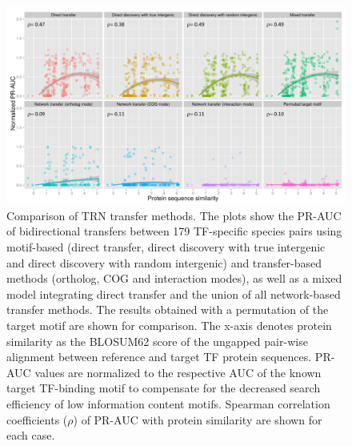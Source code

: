 \begin{figure}
  \centering
  \includegraphics[width=\textwidth]{figures/chapter3/comparison-transfer-methods}
  \caption{Comparison of TRN transfer methods. The plots show the PR-AUC of
    bidirectional transfers between 179 TF-specific species pairs using
    motif-based (direct transfer, direct discovery with true intergenic and
    direct discovery with random intergenic) and transfer-based methods
    (ortholog, COG and interaction modes), as well as a mixed model integrating
    direct transfer and the union of all network-based transfer methods. The
    results obtained with a permutation of the target motif are shown for
    comparison. The x-axis denotes protein similarity as the BLOSUM62 score of
    the ungapped pair-wise alignment between reference and target TF protein
    sequences. PR-AUC values are normalized to the respective AUC of the known
    target TF-binding motif to compensate for the decreased search efficiency
    of low information content motifs. Spearman correlation coefficients
    ($\rho$) of PR-AUC with protein similarity are shown for each case.}
\label{fig:comparison-transfer-methods}
\end{figure}

